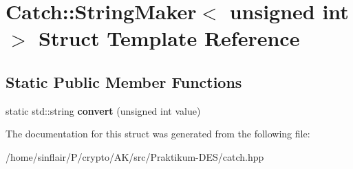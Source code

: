 \hypertarget{structCatch_1_1StringMaker_3_01unsigned_01int_01_4}{}\section{Catch\+:\+:String\+Maker$<$ unsigned int $>$ Struct Template Reference}
\label{structCatch_1_1StringMaker_3_01unsigned_01int_01_4}
\subsection*{Static Public Member Functions}
\begin{DoxyCompactItemize}
\item 
\mbox{\label{structCatch_1_1StringMaker_3_01unsigned_01int_01_4_aa0ec816ef8a65664b0524d55d08e2fd9}} 
static std\+::string {\bfseries convert} (unsigned int value)
\end{DoxyCompactItemize}


The documentation for this struct was generated from the following file\+:\begin{DoxyCompactItemize}
\item 
/home/sinflair/\+P/crypto/\+A\+K/src/\+Praktikum-\/\+D\+E\+S/catch.\+hpp\end{DoxyCompactItemize}
